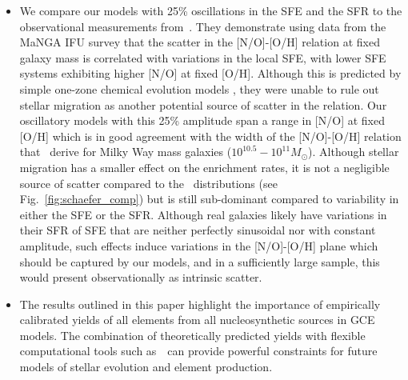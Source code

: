 \documentclass[ms.tex]{subfiles}
\begin{document}
\begin{itemize}
	\item We compare our models with 25\% oscillations in the SFE and the SFR
	to the observational measurements from~\citet{Schaefer2020}.
	They demonstrate using data from the MaNGA IFU survey that the scatter in
	the [N/O]-[O/H] relation at fixed galaxy mass is correlated with variations
	in the local SFE, with lower SFE systems exhibiting higher [N/O] at fixed
	[O/H].
	Although this is predicted by simple one-zone chemical evolution models
	\citep[e.g.][]{Molla2006, Vincenzo2016a}, they were unable to rule out
	stellar migration as another potential source of scatter in the relation.
	Our oscillatory models with this 25\% amplitude span a range in [N/O] at
	fixed [O/H] which is in good agreement with the width of the [N/O]-[O/H]
	relation that~\citet{Schaefer2020} derive for Milky Way mass galaxies
	($10^{10.5} - 10^{11} M_\odot$).
	Although stellar migration has a smaller effect on the enrichment rates, it
	is not a negligible source of scatter compared to the~\citet{Schaefer2020}
	distributions (see Fig.~\ref{fig:schaefer_comp}) but is still sub-dominant
	compared to variability in either the SFE or the SFR.
	Although real galaxies likely have variations in their SFR of SFE that are
	neither perfectly sinusoidal nor with constant amplitude, such effects
	induce variations in the [N/O]-[O/H] plane which should be captured by our
	models, and in a sufficiently large sample, this would present
	observationally as intrinsic scatter.

	\item The results outlined in this paper highlight the importance of 
	empirically calibrated yields of all elements from all nucleosynthetic 
	sources in GCE models. 
	The combination of theoretically predicted yields with flexible 
	computational tools such as~\vice~can provide powerful constraints for 
	future models of stellar evolution and element production. 
\end{itemize} 
\end{document}
